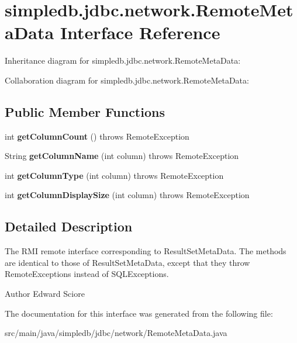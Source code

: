 \hypertarget{interfacesimpledb_1_1jdbc_1_1network_1_1RemoteMetaData}{}\section{simpledb.\+jdbc.\+network.\+Remote\+Meta\+Data Interface Reference}
\label{interfacesimpledb_1_1jdbc_1_1network_1_1RemoteMetaData}


Inheritance diagram for simpledb.\+jdbc.\+network.\+Remote\+Meta\+Data\+:


Collaboration diagram for simpledb.\+jdbc.\+network.\+Remote\+Meta\+Data\+:
\subsection*{Public Member Functions}
\begin{DoxyCompactItemize}
\item 
\mbox{\label{interfacesimpledb_1_1jdbc_1_1network_1_1RemoteMetaData_a00a76e7a9732e678451d5ca53a04ed75}} 
int {\bfseries get\+Column\+Count} ()  throws Remote\+Exception
\item 
\mbox{\label{interfacesimpledb_1_1jdbc_1_1network_1_1RemoteMetaData_aeb7c543e1cf805d1dc5eedf757c92ff7}} 
String {\bfseries get\+Column\+Name} (int column)  throws Remote\+Exception
\item 
\mbox{\label{interfacesimpledb_1_1jdbc_1_1network_1_1RemoteMetaData_a860576884664a9a6f111481f5217932a}} 
int {\bfseries get\+Column\+Type} (int column)  throws Remote\+Exception
\item 
\mbox{\label{interfacesimpledb_1_1jdbc_1_1network_1_1RemoteMetaData_a68c37ed8f3cacf347202e1ea51f0afb2}} 
int {\bfseries get\+Column\+Display\+Size} (int column)  throws Remote\+Exception
\end{DoxyCompactItemize}


\subsection{Detailed Description}
The R\+MI remote interface corresponding to Result\+Set\+Meta\+Data. The methods are identical to those of Result\+Set\+Meta\+Data, except that they throw Remote\+Exceptions instead of S\+Q\+L\+Exceptions. \begin{DoxyAuthor}{Author}
Edward Sciore 
\end{DoxyAuthor}


The documentation for this interface was generated from the following file\+:\begin{DoxyCompactItemize}
\item 
src/main/java/simpledb/jdbc/network/Remote\+Meta\+Data.\+java\end{DoxyCompactItemize}
